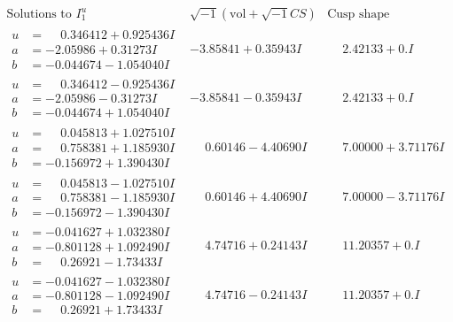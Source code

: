 \documentclass[1p]{elsarticle_modified}
\theoremstyle{definition}
\newcommand{\I}{\sqrt{-1}}
\begin{document}
$$\begin{array}{c|c|c}  
\text{Solutions to }I^u_{1}& \I (\text{vol} + \sqrt{-1}CS) & \text{Cusp shape}\\
 \hline 
\begin{aligned}
u &= \phantom{-}0.346412 + 0.925436 I \\
a &= -2.05986 + 0.31273 I \\
b &= -0.044674 - 1.054040 I\end{aligned}
 & -3.85841 + 0.35943 I & \phantom{-}2.42133 + 0. I\phantom{ +0.000000I} \\ \hline\begin{aligned}
u &= \phantom{-}0.346412 - 0.925436 I \\
a &= -2.05986 - 0.31273 I \\
b &= -0.044674 + 1.054040 I\end{aligned}
 & -3.85841 - 0.35943 I & \phantom{-}2.42133 + 0. I\phantom{ +0.000000I} \\ \hline\begin{aligned}
u &= \phantom{-}0.045813 + 1.027510 I \\
a &= \phantom{-}0.758381 + 1.185930 I \\
b &= -0.156972 + 1.390430 I\end{aligned}
 & \phantom{-}0.60146 - 4.40690 I & \phantom{-}7.00000 + 3.71176 I \\ \hline\begin{aligned}
u &= \phantom{-}0.045813 - 1.027510 I \\
a &= \phantom{-}0.758381 - 1.185930 I \\
b &= -0.156972 - 1.390430 I\end{aligned}
 & \phantom{-}0.60146 + 4.40690 I & \phantom{-}7.00000 - 3.71176 I \\ \hline\begin{aligned}
u &= -0.041627 + 1.032380 I \\
a &= -0.801128 + 1.092490 I \\
b &= \phantom{-}0.26921 - 1.73433 I\end{aligned}
 & \phantom{-}4.74716 + 0.24143 I & \phantom{-}11.20357 + 0. I\phantom{ +0.000000I} \\ \hline\begin{aligned}
u &= -0.041627 - 1.032380 I \\
a &= -0.801128 - 1.092490 I \\
b &= \phantom{-}0.26921 + 1.73433 I\end{aligned}
 & \phantom{-}4.74716 - 0.24143 I & \phantom{-}11.20357 + 0. I\phantom{ +0.000000I} \\ \hline\begin{aligned}

\end{aligned}
\end{array}$$
\end{document}
